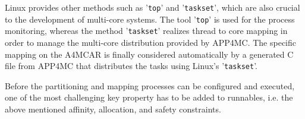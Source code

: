 \documentclass [a4paper,final,conference,10pt]{IDAACS}
\begin{document}
Linux provides other methods such as '\texttt{top}' and '\texttt{taskset}', which are also crucial to the development of multi-core systems. The tool '\texttt{top}' is used for the process monitoring, whereas the method '\texttt{taskset}' realizes thread to core mapping in order to manage the multi-core distribution provided by APP4MC.
The specific mapping on the A4MCAR is finally considered automatically by a generated C file from APP4MC that distributes the tasks using Linux's '\texttt{taskset}'.

Before the partitioning and mapping processes can be configured and executed, one of the most challenging key property has to be added to runnables, i.e. the above mentioned affinity, allocation, and safety constraints.



\end{document}
